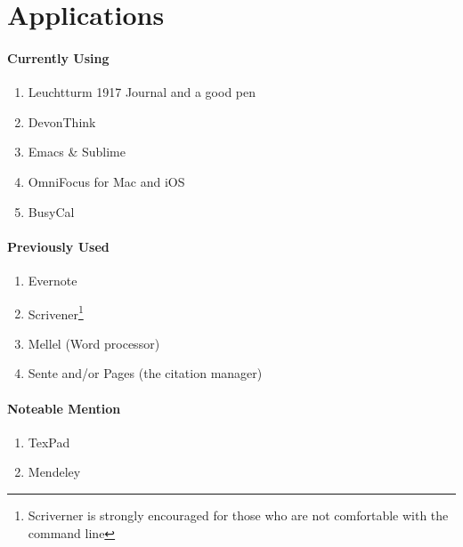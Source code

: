 \documentclass{tufte-handout}
\begin{document}

\section{Applications} %
\label{sec:applications}

\paragraph{Currently Using} %
\label{par:currently_using}
\begin{enumerate}
  \item[] Leuchtturm 1917 Journal and a good pen
  \item[] DevonThink
  \item[] Emacs \& Sublime
  \item[] OmniFocus for Mac and iOS
  \item[] BusyCal
\end{enumerate}

\paragraph{Previously Used} %
\label{par:previously_used}

\begin{enumerate}
  \item[] Evernote
  \item[] Scrivener\footnote{Scriverner is strongly encouraged for those who are not comfortable with the command line}
  \item[] Mellel (Word processor)
  \item[] Sente and/or Pages (the citation manager)
\end{enumerate}


\paragraph{Noteable Mention} %
\label{par:noteable_mention}

\begin{enumerate}
  \item[] TexPad
  \item[] Mendeley
\end{enumerate}
\nocite{*}

\renewcommand{\bibname}{Further Reading} 


\end{document}
